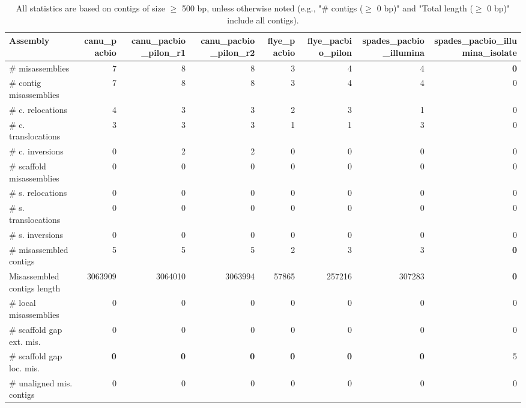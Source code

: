 \documentclass[12pt,a4paper]{article}
\begin{document}
\begin{table}[ht]
\begin{center}
\caption{All statistics are based on contigs of size $\geq$ 500 bp, unless otherwise noted (e.g., "\# contigs ($\geq$ 0 bp)" and "Total length ($\geq$ 0 bp)" include all contigs).}
\begin{tabular}{|l*{7}{|r}|}
\hline
Assembly & canu\_pacbio & canu\_pacbio\_pilon\_r1 & canu\_pacbio\_pilon\_r2 & flye\_pacbio & flye\_pacbio\_pilon & spades\_pacbio\_illumina & spades\_pacbio\_illumina\_isolate \\ \hline
\# misassemblies & 7 & 8 & 8 & 3 & 4 & 4 & {\bf 0} \\ \hline
\hspace{2mm}\# contig misassemblies & 7 & 8 & 8 & 3 & 4 & 4 & 0 \\ \hline
\hspace{5mm}\# c. relocations & 4 & 3 & 3 & 2 & 3 & 1 & 0 \\ \hline
\hspace{5mm}\# c. translocations & 3 & 3 & 3 & 1 & 1 & 3 & 0 \\ \hline
\hspace{5mm}\# c. inversions & 0 & 2 & 2 & 0 & 0 & 0 & 0 \\ \hline
\hspace{2mm}\# scaffold misassemblies & 0 & 0 & 0 & 0 & 0 & 0 & 0 \\ \hline
\hspace{5mm}\# s. relocations & 0 & 0 & 0 & 0 & 0 & 0 & 0 \\ \hline
\hspace{5mm}\# s. translocations & 0 & 0 & 0 & 0 & 0 & 0 & 0 \\ \hline
\hspace{5mm}\# s. inversions & 0 & 0 & 0 & 0 & 0 & 0 & 0 \\ \hline
\# misassembled contigs & 5 & 5 & 5 & 2 & 3 & 3 & {\bf 0} \\ \hline
Misassembled contigs length & 3063909 & 3064010 & 3063994 & 57865 & 257216 & 307283 & {\bf 0} \\ \hline
\# local misassemblies & 0 & 0 & 0 & 0 & 0 & 0 & 0 \\ \hline
\# scaffold gap ext. mis. & 0 & 0 & 0 & 0 & 0 & 0 & 0 \\ \hline
\# scaffold gap loc. mis. & {\bf 0} & {\bf 0} & {\bf 0} & {\bf 0} & {\bf 0} & {\bf 0} & 5 \\ \hline
\# unaligned mis. contigs & 0 & 0 & 0 & 0 & 0 & 0 & 0 \\ \hline

\end{tabular}
\end{center}
\end{table}
\end{document}
